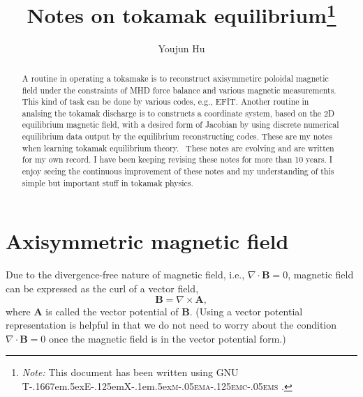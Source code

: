 \documentclass{llncs}
\newcommand{\TeXmacs}{T\kern-.1667em\lower.5ex\hbox{E}\kern-.125emX\kern-.1em\lower.5ex\hbox{\textsc{m\kern-.05ema\kern-.125emc\kern-.05ems}}}
\newcommand{\citetexmacs}[1]{This document has been written using GNU {\TeXmacs} \cite{#1}.}
\newcommand{\tmnote}[1]{\thanks{\textit{Note:} #1}}
\begin{document}
\title{Notes on tokamak equilibrium\tmnote{{\citetexmacs{TeXmacs:website}}}}

\author{Youjun Hu}


\maketitle

\begin{abstract}
  A routine in operating a tokamake is to reconstruct axisymmetirc poloidal
  magnetic field under the constraints of MHD force balance and various
  magnetic measurements. This kind of task can be done by various codes, e.g.,
  EFIT. Another routine in analsing the tokamak discharge is to constructs a
  coordinate system, based on the 2D equilibrium magnetic field, with a
  desired form of Jacobian by using discrete numerical equilibrium data output
  by the equilibrium reconstructing codes. These are my notes when learning
  tokamak equilibrium theory. \ These notes are evolving and are written for
  my own record. I have been keeping revising these notes for more than 10
  years. I enjoy seeing the continuous improvement of these notes and my
  understanding of this simple but important stuff in tokamak physics.
\end{abstract}

\section{ Axisymmetric magnetic field}\label{5-13-1s}

Due to the divergence-free nature of magnetic field, i.e., $\nabla \cdot
\mathbf{B}= 0$, magnetic field can be expressed as the curl of a vector field,
\begin{equation}
  \mathbf{B}= \nabla \times \mathbf{A},
\end{equation}
where $\mathbf{A}$ is called the vector potential of $\mathbf{B}$. (Using a
vector potential representation is helpful in that we do not need to worry
about the condition $\nabla \cdot \mathbf{B}= 0$ once the magnetic field is in
the vector potential form.)
\end{document}
